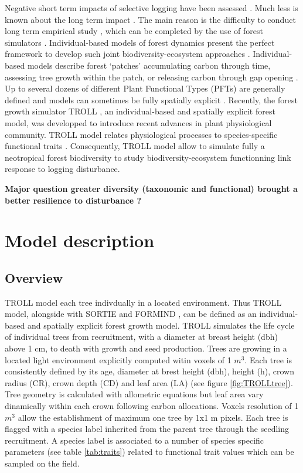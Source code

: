 \documentclass[]{article}
\theoremstyle{definition}
\theoremstyle{definition}
\theoremstyle{remark}
\begin{document}
Negative short term impacts of selective logging have been assessed
\citetext{\citealp{Carreno-Rocabado2012}; \citealp{DeAvila2015}; \citealp[but
see][]{Martin2015}}. Much less is known about the long term impact
\citep{Osazuwa-Peters2015}. The main reason is the difficulty to conduct
long term empirical study \citep[but see][]{Herault2010}, which can be
completed by the use of forest simulators
\citep{Huth2004, Khler2004, Ruger2008, Tietjen2006}. Individual-based
models of forest dynamics present the perfect framework to develop such
joint biodiversity-ecosystem approaches \citep{Li}. Individual-based
models describe forest `patches' accumulating carbon through time,
assessing tree growth within the patch, or releasing carbon through gap
opening \citep{Bugmann2001}. Up to several dozens of different Plant
Functional Types (PFTs) are generally defined and models can sometimes
be fully spatially explicit \citep{Pacala1996}. Recently, the forest
growth simulator TROLL \citep{Chave1999}, an individual-based and
spatially explicit forest model, was developped to introduce recent
advances in plant physiological community. TROLL model relates
physiological processes to species-specific functional traits
\citep{Li}. Consequently, TROLL model allow to simulate fully a
neotropical forest biodiversity to study biodiversity-ecosystem
functionning link response to logging disturbance.

\textbf{Major question greater diversity (taxonomic and functional)
brought a better resilience to disturbance ?}

\section{Model description}\label{model-description}

\subsection{Overview}\label{overview}

TROLL model each tree indivdually in a located environment. Thus TROLL
model, alongside with SORTIE \citep{Pacala1996, Uriarte2009} and FORMIND
\citep{Fischer2016, Kohler1998}, can be defined as an individual-based
and spatially explicit forest growth model. TROLL simulates the life
cycle of individual trees from recruitment, with a diameter at breast
height (dbh) above 1 cm, to death with growth and seed production. Trees
are growing in a located light environment explicitly computed witin
voxels of 1 \(m^3\). Each tree is consistently defined by its age,
diameter at brest height (dbh), height (h), crown radius (CR), crown
depth (CD) and leaf area (LA) (see figure \ref{fig:TROLLtree}). Tree
geometry is calculated with allometric equations but leaf area vary
dinamically within each crown following carbon allocations. Voxels
resolution of 1 \(m^3\) allow the establishment of maximum one tree by
1x1 m pixels. Each tree is flagged with a species label inherited from
the parent tree through the seedling recruitment. A species label is
associated to a number of species specific parameters (see table
\ref{tab:traits}) related to functional trait values which can be
sampled on the field.
\end{document}
